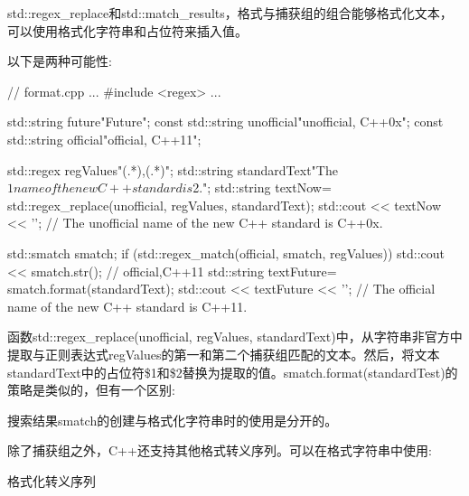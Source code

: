 
std::regex\_replace和std::match\_results，格式与捕获组的组合能够格式化文本，可以使用格式化字符串和占位符来插入值。

以下是两种可能性:


\begin{cpp}
// format.cpp
...
#include <regex>
...

std::string future{"Future"};
const std::string unofficial{"unofficial, C++0x"};
const std::string official{"official, C++11"};

std::regex regValues{"(.*),(.*)"};
std::string standardText{"The $1 name of the new C++ standard is $2."};
std::string textNow= std::regex_replace(unofficial, regValues, standardText);
std::cout << textNow << '\n';
			// The unofficial name of the new C++ standard is C++0x.

std::smatch smatch;
if (std::regex_match(official, smatch, regValues)){
	std::cout << smatch.str(); // official,C++11
	std::string textFuture= smatch.format(standardText);
	std::cout << textFuture << '\n';
} // The official name of the new C++ standard is C++11.
\end{cpp}

函数std::regex\_replace(unofficial, regValues, standardText)中，从字符串非官方中提取与正则表达式regValues的第一和第二个捕获组匹配的文本。然后，将文本standardText中的占位符\$1和\$2替换为提取的值。smatch.format(standardTest)的策略是类似的，但有一个区别: 

搜索结果smatch的创建与格式化字符串时的使用是分开的。

除了捕获组之外，C++还支持其他格式转义序列。可以在格式字符串中使用:

\begin{center}
格式化转义序列
\end{center}

